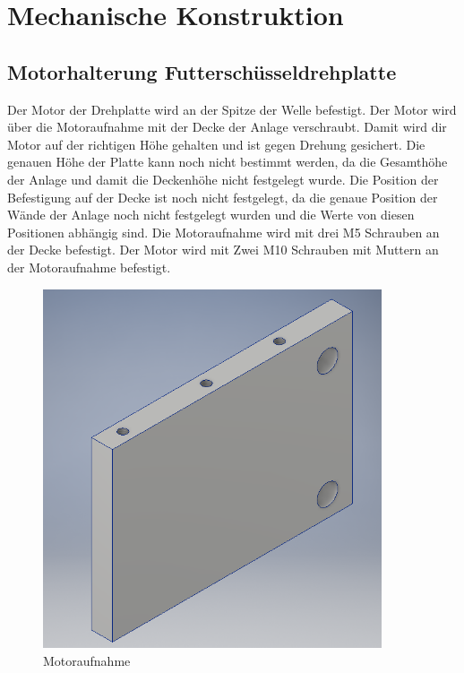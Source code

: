 \section{Mechanische Konstruktion}
\subsection{Motorhalterung Futterschüsseldrehplatte}
Der Motor der Drehplatte wird an der Spitze der Welle befestigt. Der Motor wird über die Motoraufnahme mit der Decke der Anlage verschraubt. Damit wird dir Motor auf der richtigen Höhe gehalten und ist gegen Drehung gesichert. Die genauen Höhe der Platte kann noch nicht bestimmt werden, da die Gesamthöhe der Anlage und damit die Deckenhöhe nicht festgelegt wurde. Die Position der Befestigung auf der Decke ist noch nicht festgelegt, da die genaue Position der Wände der Anlage noch nicht festgelegt wurden und die Werte von diesen Positionen abhängig sind. Die Motoraufnahme wird mit drei M5 Schrauben an der Decke befestigt. Der Motor wird mit Zwei M10 Schrauben mit Muttern an der Motoraufnahme befestigt.
\begin{figure}[H] 
\begin{center}
\includegraphics[width=10cm]{Bilder/Inventor/Motoraufnahme}
\caption{Motoraufnahme}
\label{Motoraufnahme}
\end{center}
\end{figure}
\newpage
